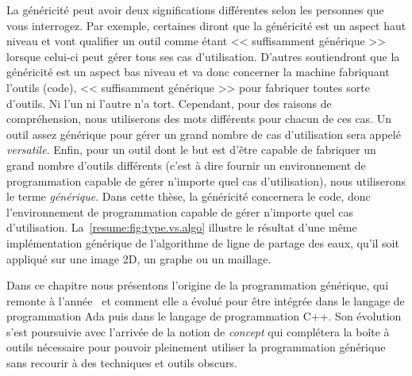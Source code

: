 La généricité peut avoir deux significations différentes selon les personnes que vous interrogez. Par exemple, certaines
diront que la généricité est un aspect haut niveau et vont qualifier un outil comme étant << suffisamment générique >>
lorsque celui-ci peut gérer tous ses cas d'utilisation. D'autres soutiendront que la généricité est un aspect bas niveau
et va donc concerner la machine fabriquant l'outils (code), << suffisamment générique >> pour fabriquer toutes sorte
d'outils. Ni l'un ni l'autre n'a tort. Cependant, pour des raisons de compréhension, nous utiliserons des mots
différents pour chacun de ces cas. Un outil assez générique pour gérer un grand nombre de cas d'utilisation sera appelé
\emph{versatile}. Enfin, pour un outil dont le but est d'être capable de fabriquer un grand nombre d'outils différents
(c'est à dire fournir un environnement de programmation capable de gérer n'importe quel cas d'utilisation), nous
utiliserons le terme \emph{générique}. Dans cette thèse, la généricité concernera le code, donc l'environnement de
programmation capable de gérer n'importe quel cas d'utilisation. La~\cref{resume:fig:type.vs.algo} illustre le résultat
d'une même implémentation générique de l'algorithme de ligne de partage des eaux, qu'il soit appliqué sur une image 2D,
un graphe ou un maillage.

Dans ce chapitre nous présentons l'origine de la programmation générique, qui remonte à
l'année~ et comment elle a évolué pour être intégrée dans le langage de
programmation Ada puis dans le langage de programmation C++. Son évolution s'est poursuivie avec l'arrivée de la notion
de \emph{concept} qui complétera la boîte à outils nécessaire pour pouvoir pleinement utiliser la programmation
générique sans recourir à des techniques et outils obscurs.

